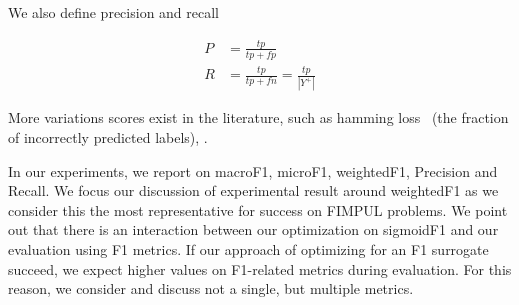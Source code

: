 We also define precision and recall

\begin{equation}
\begin{aligned} P &=\frac{t p}{t p+f p} \\ R &=\frac{t p}{t p+f n}=\frac{t p}{\left|Y^{+}\right|} \end{aligned}
\end{equation}

More variations scores exist in the literature, such as hamming loss~\cite{hammingLoss} (the fraction of incorrectly predicted labels), .

In our experiments, we report on macroF1, microF1, weightedF1, Precision and Recall. We focus our discussion of experimental result around weightedF1 as we consider this the most representative for success on FIMPUL problems. 
We point out that there is an interaction between our optimization on sigmoidF1 and our evaluation using F1 metrics. If our approach of optimizing for an F1 surrogate succeed, we expect higher values on F1-related metrics during evaluation. For this reason, we consider and discuss not a single, but multiple metrics.





